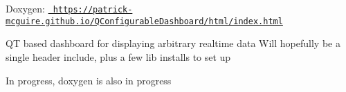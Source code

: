 Doxygen\+: \href{https://patrick-mcguire.github.io/QConfigurableDashboard/html/index.html}{\texttt{ https\+://patrick-\/mcguire.\+github.\+io/\+Q\+Configurable\+Dashboard/html/index.\+html}}

QT based dashboard for displaying arbitrary realtime data Will hopefully be a single header include, plus a few lib installs to set up

In progress, doxygen is also in progress 